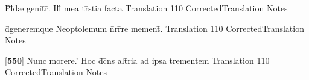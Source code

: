 \latline
  {P\={}l\={\macron {\i}}d{\ae} genit\={}r\={\macron {\i}}.  Ill\={\macron {\i}} mea tr\={\macron {\i}}stia facta}
  { Translation }
  {110}
  { CorrectedTranslation }
  { Notes }


\latline
  {d\={}generemque Neoptolemum n\={}rr\={}re mement\={}.}
  { Translation }
  {110}
  { CorrectedTranslation }
  { Notes }


\latline
  {[\textbf{550}] Nunc morere.'  Hoc d\={\macron {\i}}c\={}ns alt\={}ria ad ipsa trementem}
  { Translation }
  {110}
  { CorrectedTranslation }
  { Notes }


